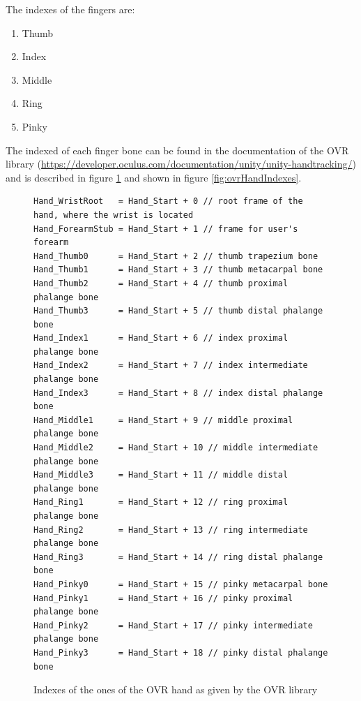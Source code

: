 \documentclass{article}
\begin{document}
The indexes of the fingers are:
\begin{enumerate}
    \item Thumb
    \item Index
    \item Middle
    \item Ring
    \item Pinky
\end{enumerate}

The indexed of each finger bone can be found in the documentation of the OVR library (\url{https://developer.oculus.com/documentation/unity/unity-handtracking/}) and is described in figure \ref{fig:ovrHandIndexesTab} and shown in figure \ref{fig:ovrHandIndexes}.

\begin{figure}[h]
    \centering
    \begin{verbatim}
Hand_WristRoot   = Hand_Start + 0 // root frame of the hand, where the wrist is located
Hand_ForearmStub = Hand_Start + 1 // frame for user's forearm
Hand_Thumb0      = Hand_Start + 2 // thumb trapezium bone
Hand_Thumb1      = Hand_Start + 3 // thumb metacarpal bone
Hand_Thumb2      = Hand_Start + 4 // thumb proximal phalange bone
Hand_Thumb3      = Hand_Start + 5 // thumb distal phalange bone
Hand_Index1      = Hand_Start + 6 // index proximal phalange bone
Hand_Index2      = Hand_Start + 7 // index intermediate phalange bone
Hand_Index3      = Hand_Start + 8 // index distal phalange bone
Hand_Middle1     = Hand_Start + 9 // middle proximal phalange bone
Hand_Middle2     = Hand_Start + 10 // middle intermediate phalange bone
Hand_Middle3     = Hand_Start + 11 // middle distal phalange bone
Hand_Ring1       = Hand_Start + 12 // ring proximal phalange bone
Hand_Ring2       = Hand_Start + 13 // ring intermediate phalange bone
Hand_Ring3       = Hand_Start + 14 // ring distal phalange bone
Hand_Pinky0      = Hand_Start + 15 // pinky metacarpal bone
Hand_Pinky1      = Hand_Start + 16 // pinky proximal phalange bone
Hand_Pinky2      = Hand_Start + 17 // pinky intermediate phalange bone
Hand_Pinky3      = Hand_Start + 18 // pinky distal phalange bone
\end{verbatim}
    \caption{Indexes of the ones of the OVR hand as given by the OVR library}
    \label{fig:ovrHandIndexesTab}
\end{figure}
\end{document}
